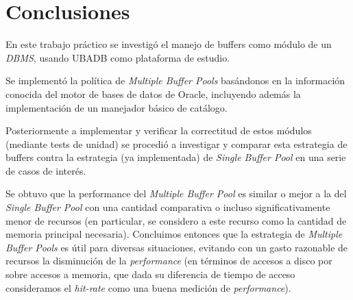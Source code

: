 \section{Conclusiones}

En este trabajo pr\'actico se investig\'o el manejo de buffers
como m\'odulo de un \textit{DBMS}, usando UBADB como plataforma de estudio. 

Se implement\'o la pol\'itica de \textit{Multiple Buffer Pools} bas\'andonos en la informaci\'on conocida del motor de bases de datos de Oracle, incluyendo adem\'as la implementaci\'on de un manejador b\'asico de cat\'alogo. 

Posteriormente a implementar y verificar la correctitud de estos m\'odulos (mediante tests de unidad) se procedi\'o a investigar y comparar esta estrategia de buffers contra la estrategia (ya implementada) de \textit{Single Buffer Pool} en una serie de casos de inter\'es. 

Se obtuvo que la performance del \textit{Multiple Buffer Pool} es similar o mejor a la del \textit{Single Buffer Pool} con una cantidad comparativa o incluso significativamente menor de recursos (en particular, se considero a este recurso como la cantidad de memoria principal necesaria). Concluimos entonces que la estrategia de \textit{Multiple Buffer Pools} es \'util para diversas situaciones, evitando con un gasto razonable de recursos la disminuci\'on de la \textit{performance} (en t\'erminos de accesos a disco por sobre accesos a memoria, que dada su diferencia de tiempo de acceso consideramos el \textit{hit-rate} como una buena medici\'on de \textit{performance}).
